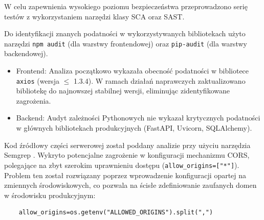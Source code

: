 W celu zapewnienia wysokiego poziomu bezpieczeństwa przeprowadzono serię testów z wykorzystaniem narzędzi klasy \gls{SCA} oraz \gls{SAST}.

Do identyfikacji znanych podatności w wykorzystywanych bibliotekach użyto narzędzi \texttt{npm audit} (dla warstwy frontendowej) oraz \texttt{pip-audit} (dla warstwy backendowej).

\begin{itemize}
    \item Frontend: Analiza początkowo wykazała obecność podatności w bibliotece \texttt{axios} (wersja $\le$ 1.3.4). W ramach działań naprawczych zaktualizowano bibliotekę do najnowszej stabilnej wersji, eliminując zidentyfikowane zagrożenia.
    \item Backend: Audyt zależności Pythonowych nie wykazał krytycznych podatności w głównych bibliotekach produkcyjnych (FastAPI, Uvicorn, SQLAlchemy).
\end{itemize}

Kod źródłowy części serwerowej został poddany analizie przy użyciu narzędzia Semgrep \cite{semgrep}.
Wykryto potencjalne zagrożenie w konfiguracji mechanizmu \gls{CORS}, polegające na zbyt szerokim uprawnieniu dostępu (\texttt{allow\_origins=["*"]}).
Problem ten został rozwiązany poprzez wprowadzenie konfiguracji opartej na zmiennych środowiskowych, co pozwala na ścisłe zdefiniowanie zaufanych domen w środowisku produkcyjnym:
\begin{verbatim}
    allow_origins=os.getenv("ALLOWED_ORIGINS").split(",")
\end{verbatim}

